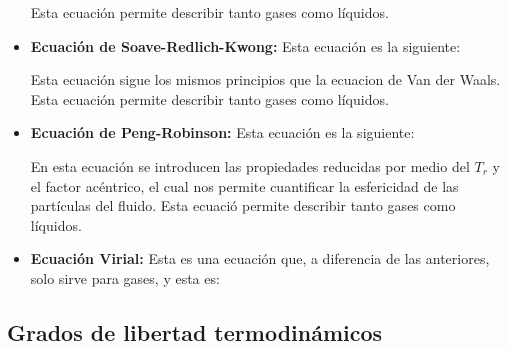 \begin{itemize}
    Esta ecuación permite describir tanto gases como líquidos.
    
    \item \textbf{Ecuación de Soave-Redlich-Kwong:} Esta ecuación es la siguiente:
    
    
    Esta ecuación sigue los mismos principios que la ecuacion de Van der Waals.
    Esta ecuación permite describir tanto gases como líquidos.
    
    \item \textbf{Ecuación de Peng-Robinson:} Esta ecuación es la siguiente:
    
    
    En esta ecuación se introducen las propiedades reducidas por medio del $T_r$ y el factor acéntrico, el cual nos permite cuantificar la esfericidad de las partículas del fluido.
    Esta ecuació permite describir tanto gases como líquidos.

    \item \textbf{Ecuación Virial:} Esta es una ecuación que, a diferencia de las anteriores, solo sirve para gases, y esta es:

\end{itemize}

\subsection{Grados de libertad termodinámicos}

